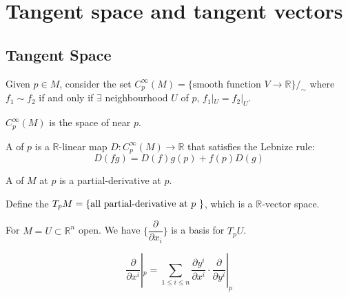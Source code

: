 \section{Tangent space and tangent vectors}
\subsection{Tangent Space}
Given  $ p\in M  $, consider the set  $ C_p^\infty(M)=\{\text{smooth function } V\rightarrow \mathbb{R}\}/_\sim $ where  $ f_1\sim f_2 $ if and only if  $ \exists $ neighbourhood  $ U $ of  $ p $,  $ f_1|_U=f_2|_U $.

 $ C_p^\infty(M) $ is the space of  near  $ p $. 

 
A  of  $ p $ is a  $ \mathbb{R} $-linear map  $ D:C_p^\infty(M)\rightarrow \mathbb{R} $ that satisfies the Lebnize rule:
\[D(fg)=D(f)g(p)+f(p)D(g)\] 
\begin{definition}
    A  of  $ M  $ at  $ p  $ is a partial-derivative at  $ p $.
    
    Define the   $ T_pM=\{\text{all partial-derivative at  $ p $ }\} $, which is a  $ \mathbb{R} $-vector space.   
\end{definition}
\begin{proposition}
    For  $ M=U\subset \mathbb{R}^n $ open. We have  $ \{\dfrac{\partial }{\partial x_i}\} $ is a basis for  $ T_pU $.   
\end{proposition}
\begin{proposition}
    \[\frac{\partial }{\partial x^i}|_p=\sum\limits_{1 \leq i \leq n}\frac{\partial y^i}{\partial x^i}\cdot \frac{\partial }{\partial y^i}|_p\]
\end{proposition}
